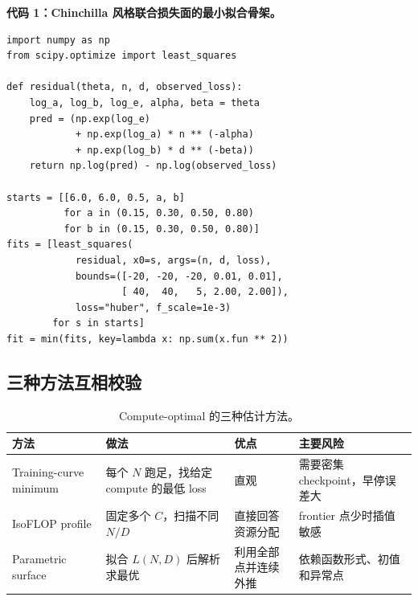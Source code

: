 \documentclass[UTF8,10pt,a4paper,fontset=none]{ctexart}
\begin{document}
\noindent\textbf{代码 1：Chinchilla 风格联合损失面的最小拟合骨架。}\par\vspace{5pt}
\begin{small}
\setlength{\fboxsep}{7pt}
\setlength{\fboxrule}{0.4pt}
\begin{lrbox}{\fitcodebox}
\begin{minipage}{\dimexpr\textwidth-2\fboxsep-2\fboxrule\relax}
\vspace{1pt}
\begin{verbatim}
import numpy as np
from scipy.optimize import least_squares

def residual(theta, n, d, observed_loss):
    log_a, log_b, log_e, alpha, beta = theta
    pred = (np.exp(log_e)
            + np.exp(log_a) * n ** (-alpha)
            + np.exp(log_b) * d ** (-beta))
    return np.log(pred) - np.log(observed_loss)

starts = [[6.0, 6.0, 0.5, a, b]
          for a in (0.15, 0.30, 0.50, 0.80)
          for b in (0.15, 0.30, 0.50, 0.80)]
fits = [least_squares(
            residual, x0=s, args=(n, d, loss),
            bounds=([-20, -20, -20, 0.01, 0.01],
                    [ 40,  40,   5, 2.00, 2.00]),
            loss="huber", f_scale=1e-3)
        for s in starts]
fit = min(fits, key=lambda x: np.sum(x.fun ** 2))
\end{verbatim}
\vspace{-5pt}
\end{minipage}
\end{lrbox}
\noindent{}\par
\end{small}

\subsection{三种方法互相校验}

\begin{table}[htbp]
\centering
\caption{Compute-optimal 的三种估计方法。}
\label{tab:fit-methods}
\begin{tabularx}{\textwidth}{Y Y Y Y}
\toprule
方法 & 做法 & 优点 & 主要风险 \\
\midrule
Training-curve minimum & 每个 $N$ 跑足，找给定 compute 的最低 loss & 直观 & 需要密集 checkpoint，早停误差大 \\
IsoFLOP profile & 固定多个 $C$，扫描不同 $N/D$ & 直接回答资源分配 & frontier 点少时插值敏感 \\
Parametric surface & 拟合 $L(N,D)$ 后解析求最优 & 利用全部点并连续外推 & 依赖函数形式、初值和异常点 \\
\bottomrule
\end{tabularx}
\end{table}
\end{document}

